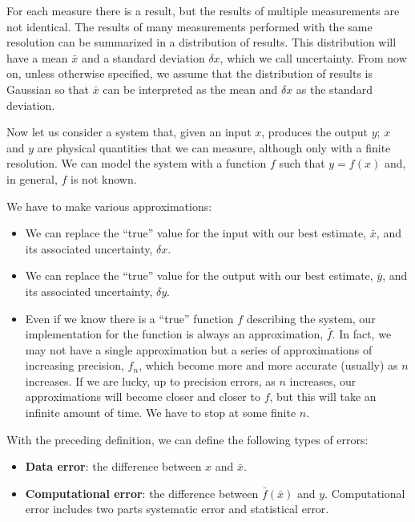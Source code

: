 \documentclass[justified, sixbynine]{tufte-book}
\theoremstyle{plain}%
\newtheorem * {corollary}{Corollary}
\theoremstyle{definition}
\theoremstyle{remark}
\newtheorem * {remark}{Remark}
\newtheorem * {note}{Note}
\begin{document}
\begin{fullwidth}
For each measure there is a result, but the results of multiple measurements are not identical. The results of many measurements performed with the same resolution can be summarized in a distribution of results. This distribution will have a mean $\bar x$ and a standard deviation $\delta x$, which we call uncertainty. From now on, unless otherwise specified, we assume that the distribution of results is Gaussian so that $\bar x$ can be interpreted as the mean and $\delta x$ as the standard deviation.

Now let us consider a system that, given an input $x$, produces the output $y$; $x$ and $y$ are physical quantities that we can measure, although only with a finite resolution. We can model the system with a function $f$ such that $y = f(x)$ and, in general, $f$ is not known.

We have to make various approximations:
\begin{itemize}
\item We can replace the ``true'' value for the input with our best estimate, $\bar x$, and its associated uncertainty, $\delta x$.

\item We can replace the ``true'' value for the output with our best estimate, $\bar y$, and its associated uncertainty, $\delta y$.

\item Even if we know there is a ``true'' function $f$ describing the system, our implementation for the function is always an approximation, $\bar f$. In fact,  we may not have a single approximation but a series of approximations of increasing precision, $f_n$, which become more and more accurate (usually) as $n$ increases. If we are lucky, up to precision errors, as $n$ increases, our approximations will become closer and closer to $f$, but this will take an infinite amount of time. We have to stop at some finite $n$.
\end{itemize}


With the preceding definition, we can define the following types of errors:

\begin{itemize}
\item {\bf Data error}: the difference between $x$ and $\bar x$.

\item {\bf Computational error}: the difference between $\bar f(\bar x)$ and $y$.
Computational error includes two parts systematic error and statistical error.


\end{itemize}
\end{fullwidth}
\end{document}
